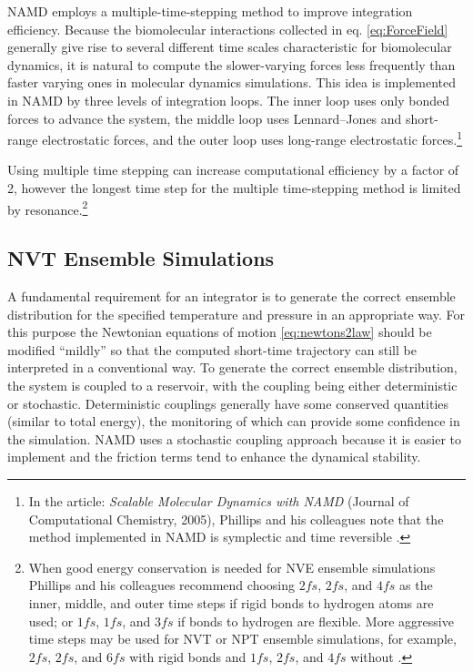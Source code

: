 NAMD employs a multiple-time-stepping method to improve integration efficiency. Because the biomolecular interactions collected in eq. \eqref{eq:ForceField} generally give rise to several different time scales characteristic for biomolecular dynamics, it is natural to compute the slower-varying forces less frequently than faster varying ones in molecular dynamics simulations. This idea is implemented in NAMD by three levels of integration loops. The inner loop uses only bonded forces to advance the system, the middle loop uses Lennard–Jones and short-range electrostatic forces, and the outer loop uses long-range electrostatic forces.\footnote{In the article: \textit{Scalable Molecular Dynamics with NAMD} (Journal of Computational Chemistry, 2005), Phillips and his colleagues note that the method implemented in NAMD is symplectic and time reversible \cite{ref:NAMD}.}

Using multiple time stepping can increase computational efficiency by a factor of 2, however the longest time step for the multiple time-stepping method is limited by resonance.\footnote{When good energy conservation is needed for NVE ensemble simulations Phillips and his colleagues recommend choosing $2 fs$, $2 fs$, and $4 fs$ as the inner, middle, and outer time steps if rigid bonds to hydrogen atoms are used; or $1 fs$, $1 fs$, and $3 fs$ if bonds to hydrogen are flexible. More aggressive time steps may be used for NVT or NPT ensemble simulations, for example, $2 fs$, $2 fs$, and $6 fs$ with rigid bonds and $1 fs$, $2 fs$, and $4 fs$ without \cite{ref:NAMD}.}

\subsection{NVT Ensemble Simulations}
A fundamental requirement for an integrator is to generate the correct ensemble distribution for the specified temperature and pressure in an appropriate way. For this purpose the Newtonian equations of motion \eqref{eq:newtons2law} should be modified ``mildly'' so that the computed short-time trajectory can still be interpreted in a conventional way. To generate the correct ensemble distribution, the system is coupled to a reservoir, with the coupling being either deterministic or stochastic. Deterministic couplings generally have some conserved quantities (similar to total energy), the monitoring of which can provide some confidence in the simulation. NAMD uses a stochastic coupling approach because it is easier to implement and the friction terms tend to enhance the dynamical stability.

